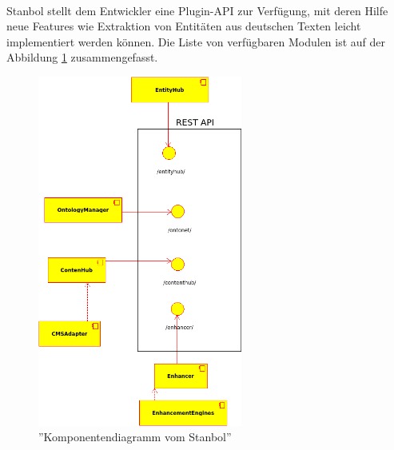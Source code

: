 \paragraph{}
Stanbol stellt dem Entwickler eine Plugin-API zur Verfügung, mit deren Hilfe neue Features wie Extraktion von Entitäten aus deutschen Texten leicht implementiert werden können. Die Liste von verfügbaren Modulen ist auf der Abbildung \ref{fig:komponenten} zusammengefasst.

\begin{figure}[ht]
\centering
\includegraphics[width=0.6\textwidth]{Bilder/komponenten.png}
\caption{''Komponentendiagramm vom Stanbol''}
\label{fig:komponenten}
\end{figure}

